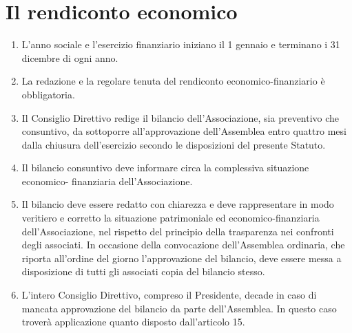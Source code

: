 \documentclass{djtsasddoc}
\begin{document}
	\section{Il rendiconto economico}
	\begin{enumerate}
		\item L'anno sociale e l'esercizio finanziario iniziano il 1 gennaio e terminano i 31 dicembre di ogni anno.
		\item La redazione e la regolare tenuta del rendiconto economico-finanziario è obbligatoria.
		\item Il Consiglio Direttivo redige il bilancio dell'Associazione, sia preventivo che consuntivo, da sottoporre all'approvazione dell'Assemblea entro quattro mesi dalla chiusura dell'esercizio secondo le disposizioni del presente Statuto.
		\item Il bilancio consuntivo deve informare circa la complessiva situazione economico- finanziaria dell'Associazione.
		\item Il bilancio deve essere redatto con chiarezza e deve rappresentare in modo veritiero e corretto la situazione patrimoniale ed economico-finanziaria dell'Associazione, nel rispetto del principio della trasparenza nei confronti degli associati. In occasione della convocazione dell'Assemblea ordinaria, che riporta all'ordine del giorno l'approvazione del bilancio, deve essere messa a disposizione di tutti gli associati copia del bilancio stesso.
		\item L'intero Consiglio Direttivo, compreso il Presidente, decade in caso di mancata approvazione del bilancio da parte dell'Assemblea. In questo caso troverà applicazione quanto disposto dall'articolo 15.
	\end{enumerate}
	
\end{document}
